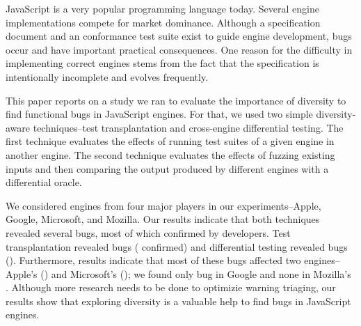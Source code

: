 JavaScript is a very popular programming language today. Several
engine implementations compete for market dominance. Although a
specification document and an conformance test suite exist to guide
engine development, bugs occur and have important practical
consequences. One reason for the difficulty in implementing correct
engines stems from the fact that the specification is intentionally
incomplete and evolves frequently.

This paper reports on a study we ran to evaluate the importance of
diversity to find functional bugs in JavaScript engines. For that, we used two
simple diversity-aware techniques--test transplantation and cross-engine
differential testing. The first technique evaluates the effects of
running test suites of a given engine in another engine. The second technique evaluates the effects of fuzzing existing inputs
and then comparing the output produced by different engines with a
differential oracle.

We considered engines from four major players in our
experiments--Apple, Google, Microsoft, and Mozilla. Our results
indicate that both techniques revealed several bugs, most of which
confirmed by developers. Test transplantation
revealed \noBugsTransplantation{} bugs
(\noBugsTransplantationConfirmed{} confirmed) and differential testing
revealed \noBugsDifferentialTesting{} bugs
(\noBugsDifferentialTestingConfirmed{}). Furthermore, results indicate
that most of these bugs affected two engines--Apple's
\jsc{} (\percJSC{}) and Microsoft's \chakra{} (\percChakra{}); we found
only  bug in Google \veight{} and none in Mozilla's
\smonkey{}. Although more research needs to be done to optimizie 
warning triaging, our results show that exploring diversity is a
valuable help to find bugs in JavaScript engines.
